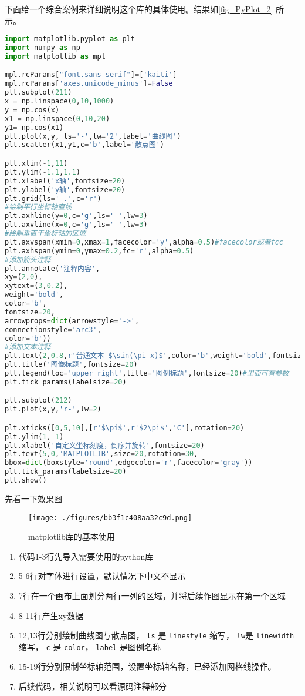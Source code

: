 下面给一个综合案例来详细说明这个库的具体使用。结果如\autoref{fig_PyPlot_2} 所示。
\begin{lstlisting}[language=python]
import matplotlib.pyplot as plt
import numpy as np
import matplotlib as mpl

mpl.rcParams["font.sans-serif"]=['kaiti']
mpl.rcParams['axes.unicode_minus']=False
plt.subplot(211)
x = np.linspace(0,10,1000)
y = np.cos(x)
x1 = np.linspace(0,10,20)
y1= np.cos(x1)
plt.plot(x,y, ls='-',lw='2',label='曲线图')
plt.scatter(x1,y1,c='b',label='散点图')

plt.xlim(-1,11)
plt.ylim(-1.1,1.1)
plt.xlabel('x轴',fontsize=20)
plt.ylabel('y轴',fontsize=20)
plt.grid(ls='-.',c='r')
#绘制平行坐标轴直线
plt.axhline(y=0,c='g',ls='-',lw=3)
plt.axvline(x=0,c='g',ls='-',lw=3)
#绘制垂直于坐标轴的区域
plt.axvspan(xmin=0,xmax=1,facecolor='y',alpha=0.5)#facecolor或者fcc
plt.axhspan(ymin=0,ymax=0.2,fc='r',alpha=0.5)
#添加箭头注释
plt.annotate('注释内容',
xy=(2,0),
xytext=(3,0.2),
weight='bold',
color='b',
fontsize=20,
arrowprops=dict(arrowstyle='->',
connectionstyle='arc3',
color='b'))
#添加文本注释
plt.text(2,0.8,r'普通文本 $\sin(\pi x)$',color='b',weight='bold',fontsize=20)
plt.title('图像标题',fontsize=20)
plt.legend(loc='upper right',title='图例标题',fontsize=20)#里面可有参数
plt.tick_params(labelsize=20)

plt.subplot(212)
plt.plot(x,y,'r-',lw=2)

plt.xticks([0,5,10],[r'$\pi$',r'$2\pi$','C'],rotation=20)
plt.ylim(1,-1)
plt.xlabel('自定义坐标刻度，倒序并旋转',fontsize=20)
plt.text(5,0,'MATPLOTLIB',size=20,rotation=30,
bbox=dict(boxstyle='round',edgecolor='r',facecolor='gray'))
plt.tick_params(labelsize=20)
plt.show()
\end{lstlisting}
先看一下效果图

\begin{figure}[ht]
\centering
\texttt{[image: ./figures/bb3f1c408aa32c9d.png]}
\caption{matplotlib库的基本使用} \label{fig_PyPlot_2}
\end{figure}

\begin{enumerate}
\item 代码1-3行先导入需要使用的python库
\item 5-6行对字体进行设置，默认情况下中文不显示
\item 7行在一个画布上面划分两行一列的区域，并将后续作图显示在第一个区域
\item 8-11行产生xy数据
\item 12,13行分别绘制曲线图与散点图， \verb|ls| 是 \verb|linestyle| 缩写， \verb|lw|是 \verb|linewidth| 缩写， \verb|c| 是 \verb|color|， \verb|label| 是图例名称
\item 15-19行分别限制坐标轴范围，设置坐标轴名称，已经添加网格线操作。
\item 后续代码，相关说明可以看源码注释部分
\end{enumerate}


